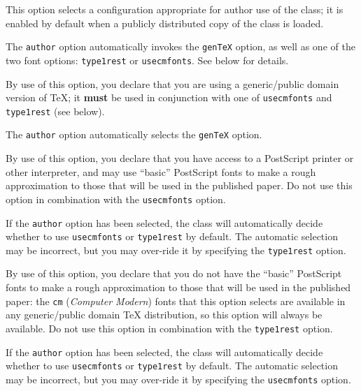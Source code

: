 \begin{description} \itemsep=0pt
  \item [\texttt{author}]
        This option selects a configuration appropriate for author use
        of the class; it is enabled by default when a
        publicly distributed copy of the class is loaded.

        The \texttt{author} option automatically invokes the
        \texttt{genTeX} option, as well as one of the two font
        options: \texttt{type1rest} or \texttt{usecmfonts}. See below
        for details.


   \item [{\tt genTeX}]

        By use of this option, you declare that you are using a
        generic/public domain version of \TeX{}; it {\bf must} be
        used in conjunction with one of \texttt{usecmfonts} and
        \texttt{type1rest} (see below).

        The \texttt{author} option automatically selects the
        \texttt{genTeX} option.


   \item [{\tt type1rest}] 

        By use of this option, you declare that you have access to a
        PostScript printer or other interpreter, and may use ``basic''
        PostScript fonts to make a rough approximation to those that
        will be used in the published paper. Do not use this option in
        combination with the \texttt{usecmfonts} option.

        If the \texttt{author} option has been selected, the class
        will automatically decide whether to use \texttt{usecmfonts}
        or \texttt{type1rest} by default. The automatic selection may
        be incorrect, but you may over-ride it by specifying the
        \texttt{type1rest} option.


   \item [{\tt usecmfonts}] 

        By use of this option, you declare that you do not have the
        ``basic'' PostScript fonts to make a rough approximation to
        those that will be used in the published paper: the \verb|cm|
        (\emph{Computer Modern}) fonts that this option selects are
        available in any generic/public domain \TeX{} distribution, so
        this option will always be available. Do not use this option
        in combination with the \texttt{type1rest} option.

        If the \texttt{author} option has been selected, the class
        will automatically decide whether to use \texttt{usecmfonts}
        or \texttt{type1rest} by default. The automatic selection may
        be incorrect, but you may over-ride it by specifying the
        \texttt{usecmfonts} option.



\end{description}
